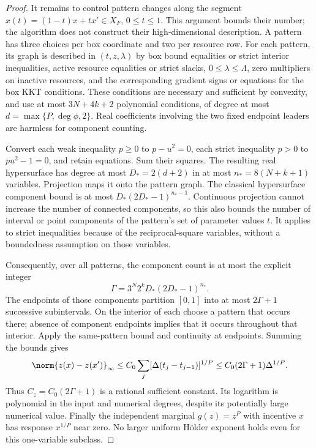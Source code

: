 \begin{proof}
It remains to control pattern changes along the segment
$x(t)=(1-t)x+tx'\in X_F$, $0\le t\le1$. This argument bounds
their number; the algorithm does not construct their high-dimensional
description. A pattern has three choices per box coordinate and two per
resource row. For each pattern, its graph is described in $(t,z,\lambda)$
by box bound equalities or strict interior inequalities, active resource
equalities or strict slacks, $0\le\lambda\le\Lambda$, zero multipliers
on inactive resources, and the corresponding gradient signs or equations
for the box KKT conditions. These conditions are necessary and sufficient
by convexity, and use at most $3N+4k+2$ polynomial conditions, of degree
at most $d=\max\{P,\deg\phi,2\}$. Real coefficients involving the two
fixed endpoint leaders are harmless for component counting.

Convert each weak inequality $p\ge0$ to $p-u^2=0$, each strict
inequality $p>0$ to $pu^2-1=0$, and retain equations. Sum their squares.
The resulting real hypersurface has degree at most $D_*=2(d+2)$ in
at most $n_*=8(N+k+1)$ variables. Projection maps it onto the pattern
graph. The classical hypersurface component bound
\cite{Milnor1964} is at most $D_*(2D_*-1)^{n_*-1}$.
Continuous projection cannot increase the number of connected components,
so this also bounds the number of interval or point components of the
pattern's set of parameter values $t$. It applies to strict inequalities
because of the reciprocal-square variables, without a boundedness
assumption on those variables.

Consequently, over all patterns, the component count is at most the
explicit integer
\[
 \Gamma=3^N2^kD_*(2D_*-1)^{n_*}.
\]
The endpoints of those components partition $[0,1]$ into at most
$2\Gamma+1$ successive subintervals. On the interior of each choose a
pattern that occurs there; absence of component endpoints implies that
it occurs throughout that interior. Apply the same-pattern bound and
continuity at endpoints. Summing the bounds gives
\[
 \norm{z(x)-z(x')}_\infty
 \le C_0\sum_j[\Delta(t_j-t_{j-1})]^{1/P}
 \le C_0(2\Gamma+1)\Delta^{1/P}.
\]
Thus $C_z=C_0(2\Gamma+1)$ is a rational sufficient constant. Its
logarithm is polynomial in the input and numerical degrees, despite
its potentially large numerical value. Finally the independent marginal
$g(z)=z^P$ with incentive $x$ has response $x^{1/P}$ near zero.
No larger uniform H\"older exponent holds even for this one-variable
subclass.
\end{proof}

